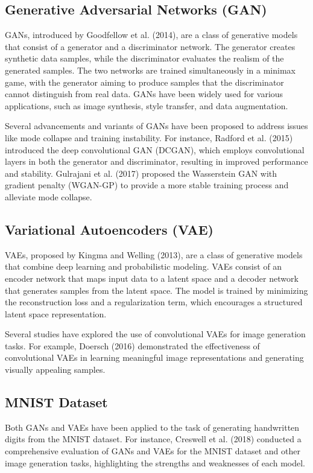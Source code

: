\documentclass{article}
\begin{document}
\subsection{Generative Adversarial Networks (GAN)}
GANs, introduced by Goodfellow et al. (2014), are a class of generative models that consist of a generator and a discriminator network. The generator creates synthetic data samples, while the discriminator evaluates the realism of the generated samples. The two networks are trained simultaneously in a minimax game, with the generator aiming to produce samples that the discriminator cannot distinguish from real data. GANs have been widely used for various applications, such as image synthesis, style transfer, and data augmentation.

Several advancements and variants of GANs have been proposed to address issues like mode collapse and training instability. For instance, Radford et al. (2015) introduced the deep convolutional GAN (DCGAN), which employs convolutional layers in both the generator and discriminator, resulting in improved performance and stability. Gulrajani et al. (2017) proposed the Wasserstein GAN with gradient penalty (WGAN-GP) to provide a more stable training process and alleviate mode collapse.

\subsection{Variational Autoencoders (VAE)}
VAEs, proposed by Kingma and Welling (2013), are a class of generative models that combine deep learning and probabilistic modeling. VAEs consist of an encoder network that maps input data to a latent space and a decoder network that generates samples from the latent space. The model is trained by minimizing the reconstruction loss and a regularization term, which encourages a structured latent space representation.

Several studies have explored the use of convolutional VAEs for image generation tasks. For example, Doersch (2016) demonstrated the effectiveness of convolutional VAEs in learning meaningful image representations and generating visually appealing samples.

\subsection{MNIST Dataset}
Both GANs and VAEs have been applied to the task of generating handwritten digits from the MNIST dataset. For instance, Creswell et al. (2018) conducted a comprehensive evaluation of GANs and VAEs for the MNIST dataset and other image generation tasks, highlighting the strengths and weaknesses of each model.
\end{document}
